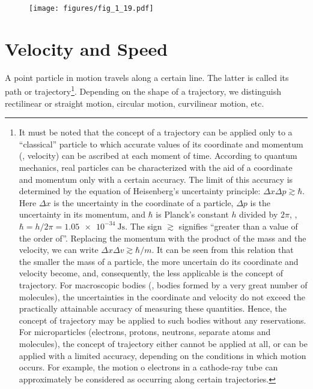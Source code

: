 \begin{figure}[t]
	\begin{center}
		\texttt{[image: figures/fig\_1\_19.pdf]}
		\caption[]{}
		\label{fig:1_19}
	\end{center}
	\vspace{-0.7cm}
\end{figure}

\section{Velocity and Speed}\label{sec:1_3}

A point particle in motion travels along a certain line. The latter is called its path or trajectory\footnote{It must be noted that the concept of a trajectory can be applied only to a ``classical'' particle to which accurate values of its coordinate and momentum (\ie, velocity) can be ascribed at each moment of time. According to quantum mechanics, real particles can be characterized with the aid of a coordinate and momentum only with a certain accuracy. The limit of this accuracy is determined by the equation of Heisenberg's uncertainty principle: $\Delta x\Delta p\gtrsim\hbar$. Here $\Delta x$ is the uncertainty in the coordinate of a particle, $\Delta p$ is the uncertainty in its momentum, and $\hbar$ is Planck's constant $h$ divided by $2\pi$, \ie, $\hbar = h/2\pi = \SI{1.05e-34}{\joule\second}$. The sign $\gtrsim$ signifies ``greater than a value of the order of''. Replacing the momentum with the product of the mass and the velocity, we can write $\Delta x\Delta v\gtrsim\hbar/m$. It can be seen from this relation that the smaller the mass of a particle, the more uncertain do its coordinate and velocity become, and, consequently, the less applicable is the concept of trajectory. For macroscopic bodies (\ie, bodies formed by a very great number of molecules), the uncertainties in the coordinate and velocity do not exceed the practically attainable accuracy of measuring these quantities. Hence, the concept of trajectory may be applied to such bodies without any reservations. For microparticles (electrons, protons, neutrons, separate atoms and molecules), the concept of trajectory either cannot be applied at all, or can be applied with a limited accuracy, depending on the conditions in which motion occurs. For example, the motion o electrons in a cathode-ray tube can approximately be considered as occurring along certain trajectories.}. Depending on the shape of a trajectory, we distinguish rectilinear or straight motion, circular motion, curvilinear motion, etc.

